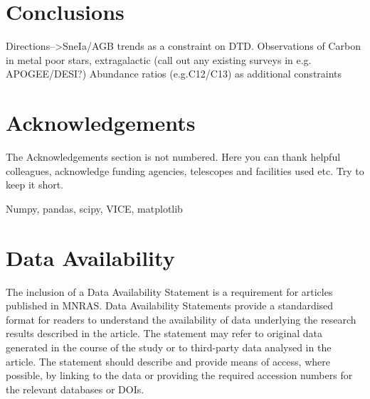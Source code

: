 \documentclass[fleqn,usenatbib]{mnras}
\begin{document}
\section{Conclusions}

Directions-->SneIa/AGB trends as a constraint on DTD.
Observations of Carbon in metal poor stars, extragalactic (call out any
existing surveys in e.g. APOGEE/DESI?)
Abundance ratios (e.g.C12/C13) as additional constraints

\section*{Acknowledgements}

The Acknowledgements section is not numbered. Here you can thank helpful
colleagues, acknowledge funding agencies, telescopes and facilities used etc.
Try to keep it short.

Numpy, pandas, scipy, VICE, matplotlib
\cite{numpy, matplotlib}

\cite{OhioSupercomputerCenter1987}

\section*{Data Availability}

 
The inclusion of a Data Availability Statement is a requirement for articles published in MNRAS. Data Availability Statements provide a standardised format for readers to understand the availability of data underlying the research results described in the article. The statement may refer to original data generated in the course of the study or to third-party data analysed in the article. The statement should describe and provide means of access, where possible, by linking to the data or providing the required accession numbers for the relevant databases or DOIs.









\end{document}

